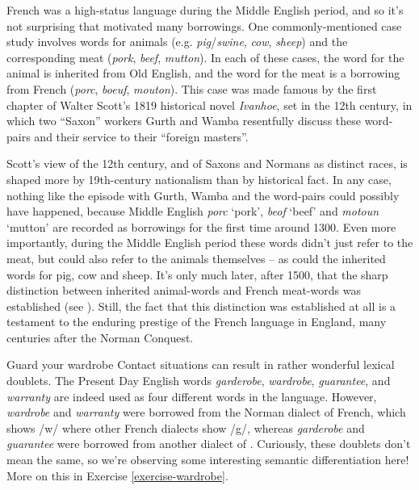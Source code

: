French was a high-status language during the Middle English period, and so it's not surprising that  motivated many borrowings. One commonly-mentioned case study involves words for animals (e.g. \emph{pig}/\emph{swine}, \emph{cow}, \emph{sheep}) and the corresponding meat (\emph{pork}, \emph{beef}, \emph{mutton}). In each of these cases, the word for the animal is inherited from Old English, and the word for the meat is a borrowing from French (\emph{porc}, \emph{boeuf}, \emph{mouton}). This case was made famous by the first chapter of Walter Scott's 1819 historical novel \emph{Ivanhoe}, set in the 12th century, in which two ``Saxon'' workers Gurth and Wamba resentfully discuss these word-pairs and their service to their ``foreign masters''.

Scott's view of the 12th century, and of Saxons and Normans as distinct races, is shaped more by 19th-century nationalism than by historical fact. In any case, nothing like the episode with Gurth, Wamba and the word-pairs could possibly have happened, because Middle English \emph{porc} `pork', \emph{beof} `beef' and \emph{motoun} `mutton' are recorded as borrowings for the first time around 1300. Even more importantly, during the Middle English period these words didn't just refer to the meat, but could also refer to the animals themselves -- as could the inherited words for pig, cow and sheep. It's only much later, after 1500, that the sharp distinction between inherited animal-words and French meat-words was established (see \citealp{Oersi2015}). Still, the fact that this distinction was established at all is a testament to the enduring prestige of the French language in England, many centuries after the Norman Conquest.


\begin{miscbox}{Guard your wardrobe}
Contact situations can result in rather wonderful lexical doublets. The Present Day English words \textit{garderobe}, \textit{wardrobe}, \textit{guarantee}, and \textit{warranty} are indeed used as four different words in the language. However, \textit{wardrobe} and \textit{warranty} were borrowed from the Norman dialect of French, which shows /w/ where other French dialects show /g/, whereas \textit{garderobe} and \textit{guarantee} were borrowed from another dialect of . Curiously, these doublets don't mean the same, so we're observing some interesting semantic differentiation here! More on this in Exercise \ref{exercise-wardrobe}.
\end{miscbox}


